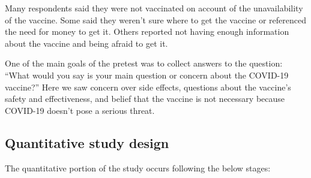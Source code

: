 \documentclass[letterpaper, 12pt, parskip=full,DIV=10]{scrartcl}
\begin{document}
Many respondents said they were not vaccinated on account of the unavailability of the vaccine. Some said they weren't sure where to get the vaccine or referenced the need for money to get it. Others reported not having enough information about the vaccine and being afraid to get it.

One of the main goals of the pretest was to collect answers to the question:  ``What would you say is your main question or concern about the COVID-19 vaccine?'' Here we saw concern over side effects, questions about the vaccine's safety and effectiveness, and belief that the vaccine is not necessary because COVID-19 doesn't pose a serious threat.

\subsection{Quantitative study design}

The quantitative portion of the study occurs following the below stages: 
\end{document}
